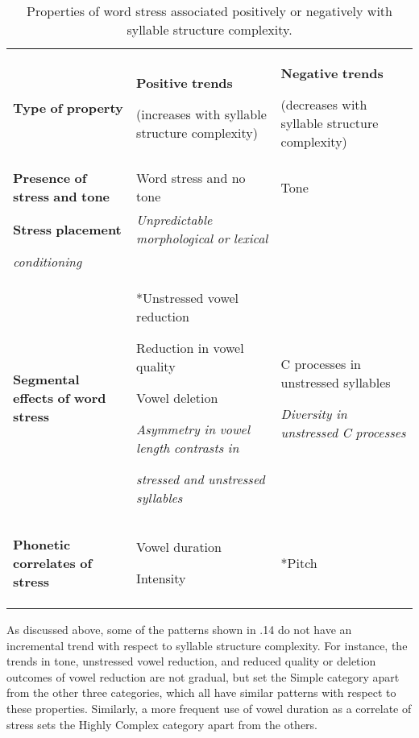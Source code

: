 \begin{table}
\begin{tabularx}{\textwidth}{XXX}
\lsptoprule

\textbf{Type} \textbf{of} \textbf{property} & \textbf{Positive} \textbf{trends}

(increases with syllable structure complexity) & \textbf{Negative} \textbf{trends}

(decreases with syllable structure complexity)\\
\textbf{Presence} \textbf{of} \textbf{stress} \textbf{and} \textbf{tone} & Word stress and no tone & Tone\\
\textbf{Stress} \textbf{placement} & \textit{Unpredictable} \textit{morphological} \textit{or} \textit{lexical}\\
     \textit{conditioning} & \\
\textbf{Segmental} \textbf{effects} \textbf{of} \textbf{word} \textbf{stress} & *Unstressed vowel reduction

Reduction in vowel quality

Vowel deletion

\textit{Asymmetry} \textit{in} \textit{vowel} \textit{length} \textit{contrasts} \textit{in} 

     \textit{stressed} \textit{and} \textit{unstressed} \textit{syllables} & C processes in unstressed syllables

\textit{Diversity} \textit{in} \textit{unstressed} \textit{C} \textit{processes}\\
\textbf{Phonetic} \textbf{correlates} \textbf{of} \textbf{stress} & Vowel duration

Intensity & *Pitch\\
\lspbottomrule
\end{tabularx}
\caption{\label{5.14}Properties of word stress associated positively or negatively with syllable structure complexity.}
\end{table}




  As discussed above, some of the patterns shown in .14 do not have an incremental trend with respect to syllable structure complexity. For instance, the trends in tone, unstressed vowel reduction, and reduced quality or deletion outcomes of vowel reduction are not gradual, but set the Simple category apart from the other three categories, which all have similar patterns with respect to these properties. Similarly, a more frequent use of vowel duration as a correlate of stress sets the Highly Complex category apart from the others.



